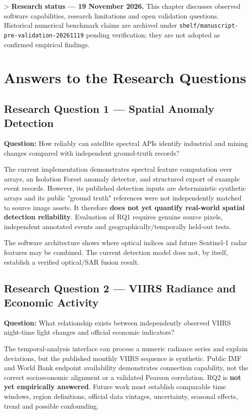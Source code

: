 
> \textbf{Research status — 19 November 2026.} This chapter discusses observed software capabilities, research limitations and open validation questions. Historical numerical benchmark claims are archived under \texttt{shelf/manuscript-pre-validation-20261119} pending verification; they are not adopted as confirmed empirical findings.

\section{Answers to the Research Questions}

\subsection{Research Question 1 — Spatial Anomaly Detection}

\textbf{Question:} How reliably can satellite spectral APIs identify industrial and mining changes compared with independent ground-truth records?

The current implementation demonstrates spectral feature computation over arrays, an Isolation Forest anomaly detector, and structured export of example event records. However, its published detection inputs are deterministic synthetic arrays and its public "ground truth" references were not independently matched to source image assets. It therefore \textbf{does not yet quantify real-world spatial detection reliability}. Evaluation of RQ1 requires genuine source pixels, independent annotated events and geographically/temporally held-out tests.

The software architecture shows where optical indices and future Sentinel-1 radar features may be combined. The current detection model does not, by itself, establish a verified optical/SAR fusion result.

\subsection{Research Question 2 — VIIRS Radiance and Economic Activity}

\textbf{Question:} What relationship exists between independently observed VIIRS night-time light changes and official economic indicators?

The temporal-analysis interface can process a numeric radiance series and explain deviations, but the published monthly VIIRS sequence is synthetic. Public IMF and World Bank endpoint availability demonstrates connection capability, not the correct socioeconomic alignment or a validated Pearson correlation. RQ2 is \textbf{not yet empirically answered}. Future work must establish comparable time windows, region definitions, official data vintages, uncertainty, seasonal effects, trend and possible confounding.

